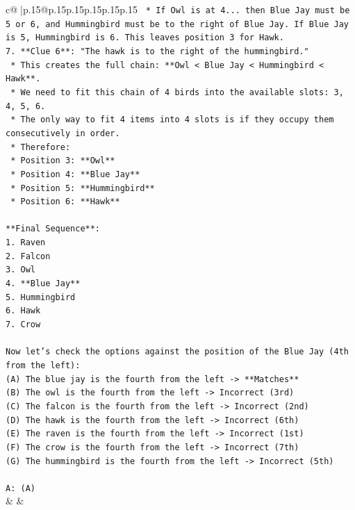 \documentclass{article}
\begin{document}
{\begin{supertabular}{c@{$\;$}|p{.15\linewidth}@{}p{.15\linewidth}p{.15\linewidth}p{.15\linewidth}p{.15\linewidth}p{.15\linewidth}}
{{{\texttt{        *   If Owl is at 4... then Blue Jay must be 5 or 6, and Hummingbird must be to the right of Blue Jay. If Blue Jay is 5, Hummingbird is 6. This leaves position 3 for Hawk.} \\
\texttt{7.  **Clue 6**: "The hawk is to the right of the hummingbird."} \\
\texttt{    *   This creates the full chain: **Owl < Blue Jay < Hummingbird < Hawk**.} \\
\texttt{    *   We need to fit this chain of 4 birds into the available slots: 3, 4, 5, 6.} \\
\texttt{    *   The only way to fit 4 items into 4 slots is if they occupy them consecutively in order.} \\
\texttt{    *   Therefore:} \\
\texttt{        *   Position 3: **Owl**} \\
\texttt{        *   Position 4: **Blue Jay**} \\
\texttt{        *   Position 5: **Hummingbird**} \\
\texttt{        *   Position 6: **Hawk**} \\
\\ 
\texttt{**Final Sequence**:} \\
\texttt{1.  Raven} \\
\texttt{2.  Falcon} \\
\texttt{3.  Owl} \\
\texttt{4.  **Blue Jay**} \\
\texttt{5.  Hummingbird} \\
\texttt{6.  Hawk} \\
\texttt{7.  Crow} \\
\\ 
\texttt{Now let's check the options against the position of the Blue Jay (4th from the left):} \\
\texttt{(A) The blue jay is the fourth from the left {-}> **Matches**} \\
\texttt{(B) The owl is the fourth from the left {-}> Incorrect (3rd)} \\
\texttt{(C) The falcon is the fourth from the left {-}> Incorrect (2nd)} \\
\texttt{(D) The hawk is the fourth from the left {-}> Incorrect (6th)} \\
\texttt{(E) The raven is the fourth from the left {-}> Incorrect (1st)} \\
\texttt{(F) The crow is the fourth from the left {-}> Incorrect (7th)} \\
\texttt{(G) The hummingbird is the fourth from the left {-}> Incorrect (5th)} \\
\\ 
\texttt{A: (A)} \\
            }
        }
    }
    & & \\ \\


\end{supertabular}}
\end{document}
